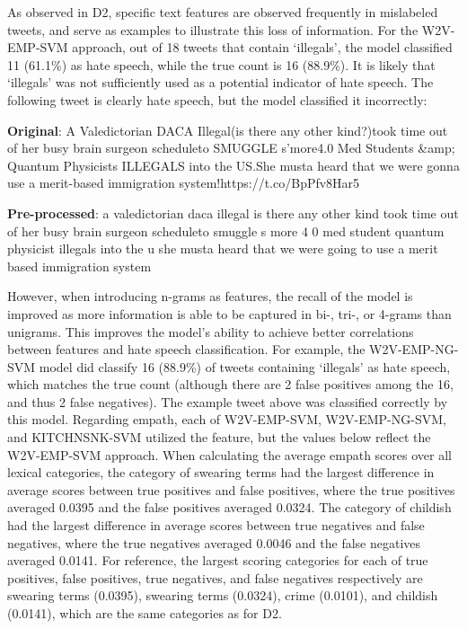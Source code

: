 \documentclass[11pt,a4paper]{article}
\begin{document}
As observed in D2, specific text features are observed frequently in mislabeled tweets, and serve as examples to illustrate this loss of information. For the W2V-EMP-SVM approach, out of 18 tweets that contain ‘illegals’, the model classified 11 (61.1\%) as hate speech, while the true count is 16 (88.9\%). It is likely that ‘illegals’ was not sufficiently used as a potential indicator of hate speech. The following tweet is clearly hate speech, but the model classified it incorrectly:

\begin{displayquote}
	\textbf{Original}: A Valedictorian DACA Illegal(is there any other kind?)took time out of her busy brain surgeon scheduleto SMUGGLE s'more4.0 Med Students \&amp; Quantum Physicists ILLEGALS into the US.She musta heard that we were gonna use a merit-based immigration system!https://t.co/BpPfv8Har5
\end{displayquote}

\begin{displayquote}
	\textbf{Pre-processed}: a valedictorian daca illegal is there any other kind took time out of her busy brain surgeon scheduleto smuggle s more 4 0 med student quantum physicist illegals into the u she musta heard that we were going to use a merit based immigration system
\end{displayquote}

However, when introducing n-grams as features, the recall of the model is improved as more information is able to be captured in bi-, tri-, or 4-grams than unigrams. This improves the model’s ability to achieve better correlations between features and hate speech classification. For example, the W2V-EMP-NG-SVM model did classify 16 (88.9\%) of tweets containing ‘illegals’ as hate speech, which matches the true count (although there are 2 false positives among the 16, and thus 2 false negatives). The example tweet above was classified correctly by this model.
Regarding empath, each of W2V-EMP-SVM, W2V-EMP-NG-SVM, and KITCHNSNK-SVM utilized the feature, but the values below reflect the W2V-EMP-SVM approach. When calculating the average empath scores over all lexical categories, the category of swearing terms had the largest difference in average scores between true positives and false positives, where the true positives averaged 0.0395 and the false positives averaged 0.0324. The category of childish had the largest difference in average scores between true negatives and false negatives, where the true negatives averaged 0.0046 and the false negatives averaged 0.0141. For reference, the largest scoring categories for each of true positives, false positives, true negatives, and false negatives respectively are swearing terms (0.0395), swearing terms (0.0324), crime (0.0101), and childish (0.0141), which are the same categories as for D2.
\end{document}
